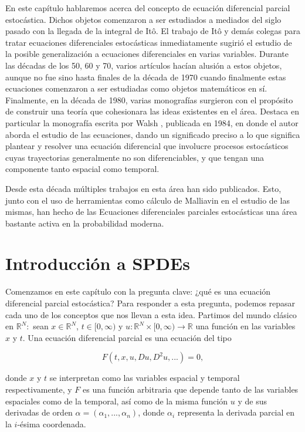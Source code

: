 \documentclass[letterpaper,twoside]{book}
\newcommand{\R}{\mathbb{R}}
\newcommand{\1}{\mathds{1}}
\renewcommand{\to}{\rightarrow}
\theoremstyle{definition}
\theoremstyle{definition}
\theoremstyle{definition}
\theoremstyle{definition}
\theoremstyle{definition}
\theoremstyle{definition}
\theoremstyle{definition}
\begin{document}
En este capítulo hablaremos acerca del concepto de ecuación diferencial parcial estocástica.
Dichos objetos comenzaron a ser estudiados a mediados del siglo pasado con la llegada de la integral de Itô.
El trabajo de Itô y demás colegas para tratar ecuaciones diferenciales estocásticas inmediatamente sugirió el estudio de la posible generalización a ecuaciones diferenciales en varias variables.
Durante las décadas de los 50, 60 y 70, varios artículos hacían alusión a estos objetos, aunque no fue sino hasta finales de la década de 1970 cuando finalmente estas ecuaciones comenzaron a ser estudiadas como objetos matemáticos en sí.
Finalmente, en la década de 1980, varias monografías surgieron con el propósito de construir una teoría que cohesionara las ideas existentes en el área. Destaca en particular la monografía escrita por Walsh \cite{Walsh_J.B_Introduction_to_SPDEs}, publicada en 1984, en donde el autor aborda el estudio de las ecuaciones, dando un significado preciso a lo que significa plantear y resolver una ecuación diferencial que involucre procesos estocásticos cuyas trayectorias generalmente no son diferenciables, y que tengan una componente tanto espacial como temporal.

Desde esta década múltiples trabajos en esta área han sido publicados. Esto, junto con el uso de herramientas como cálculo de Malliavin en el estudio de las mismas, han hecho de las Ecuaciones diferenciales parciales estocásticas una área bastante activa en la probabilidad moderna. 
\section{Introducción a SPDEs}
Comenzamos en este capítulo con la pregunta clave: ¿qué es una ecuación diferencial parcial estocástica? Para responder a esta pregunta, podemos repasar cada uno de los conceptos que nos llevan a esta idea. Partimos del mundo clásico en $\R^{N}:$ sean $x\in \R^{N}$, $t\in [0,\infty)$ y $u:\R^{N}\times[0,\infty)\to \R$ una función en las variables $x$ y $t$. Una ecuación diferencial parcial es una ecuación del tipo 

\begin{equation}\label{ec_dif_parc}
    F(t,x,u,Du,D^2u,...)=0,    
\end{equation}

donde $x$ y $t$ se interpretan como las variables espacial y temporal respectivamente, y $F$ es una función arbitraria que depende tanto de las variables espaciales como de la temporal, así como de la misma función $u$ y de sus derivadas de orden $\alpha=(\alpha_1,...,\alpha_n)$, donde $\alpha_i$ representa la derivada parcial en la $i$-ésima coordenada.
\end{document}
